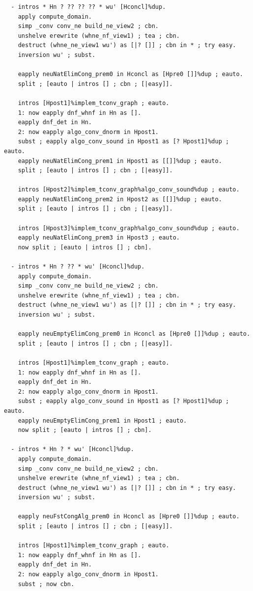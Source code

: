 \begin{lstlisting}
  - intros * Hn ? ?? ?? ?? * wu' [Hconcl]%dup.
    apply compute_domain.
    simp _conv conv_ne build_ne_view2 ; cbn.
    unshelve erewrite (whne_nf_view1) ; tea ; cbn.
    destruct (whne_ne_view1 wu') as [|? []] ; cbn in * ; try easy.
    inversion wu' ; subst.

    eapply neuNatElimCong_prem0 in Hconcl as [Hpre0 []]%dup ; eauto.
    split ; [eauto | intros [] ; cbn ; [|easy]].

    intros [Hpost1]%implem_tconv_graph ; eauto.
    1: now eapply dnf_whnf in Hn as [].
    eapply dnf_det in Hn.
    2: now eapply algo_conv_dnorm in Hpost1.
    subst ; eapply algo_conv_sound in Hpost1 as [? Hpost1]%dup ; eauto.
    eapply neuNatElimCong_prem1 in Hpost1 as [[]]%dup ; eauto.
    split ; [eauto | intros [] ; cbn ; [|easy]].

    intros [Hpost2]%implem_tconv_graph%algo_conv_sound%dup ; eauto.
    eapply neuNatElimCong_prem2 in Hpost2 as [[]]%dup ; eauto.
    split ; [eauto | intros [] ; cbn ; [|easy]].

    intros [Hpost3]%implem_tconv_graph%algo_conv_sound%dup ; eauto.
    eapply neuNatElimCong_prem3 in Hpost3 ; eauto.
    now split ; [eauto | intros [] ; cbn].

  - intros * Hn ? ?? * wu' [Hconcl]%dup.
    apply compute_domain.
    simp _conv conv_ne build_ne_view2 ; cbn.
    unshelve erewrite (whne_nf_view1) ; tea ; cbn.
    destruct (whne_ne_view1 wu') as [|? []] ; cbn in * ; try easy.
    inversion wu' ; subst.

    eapply neuEmptyElimCong_prem0 in Hconcl as [Hpre0 []]%dup ; eauto.
    split ; [eauto | intros [] ; cbn ; [|easy]].

    intros [Hpost1]%implem_tconv_graph ; eauto.
    1: now eapply dnf_whnf in Hn as [].
    eapply dnf_det in Hn.
    2: now eapply algo_conv_dnorm in Hpost1.
    subst ; eapply algo_conv_sound in Hpost1 as [? Hpost1]%dup ; eauto.
    eapply neuEmptyElimCong_prem1 in Hpost1 ; eauto.
    now split ; [eauto | intros [] ; cbn].

  - intros * Hn ? * wu' [Hconcl]%dup.
    apply compute_domain.
    simp _conv conv_ne build_ne_view2 ; cbn.
    unshelve erewrite (whne_nf_view1) ; tea ; cbn.
    destruct (whne_ne_view1 wu') as [|? []] ; cbn in * ; try easy.
    inversion wu' ; subst.

    eapply neuFstCongAlg_prem0 in Hconcl as [Hpre0 []]%dup ; eauto.
    split ; [eauto | intros [] ; cbn ; [|easy]].

    intros [Hpost1]%implem_tconv_graph ; eauto.
    1: now eapply dnf_whnf in Hn as [].
    eapply dnf_det in Hn.
    2: now eapply algo_conv_dnorm in Hpost1.
    subst ; now cbn.
    

\end{lstlisting}
